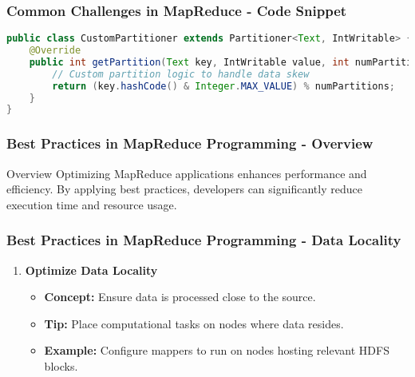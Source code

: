 \documentclass[aspectratio=169]{beamer}
\begin{document}
\begin{frame}[fragile]
    \frametitle{Common Challenges in MapReduce - Code Snippet}
    \begin{lstlisting}[language=Java]
public class CustomPartitioner extends Partitioner<Text, IntWritable> {
    @Override
    public int getPartition(Text key, IntWritable value, int numPartitions) {
        // Custom partition logic to handle data skew
        return (key.hashCode() & Integer.MAX_VALUE) % numPartitions;
    }
}
    \end{lstlisting}
\end{frame}

\begin{frame}[fragile]
    \frametitle{Best Practices in MapReduce Programming - Overview}
    \begin{block}{Overview}
        Optimizing MapReduce applications enhances performance and efficiency. 
        By applying best practices, developers can significantly reduce execution time and resource usage.
    \end{block}
\end{frame}

\begin{frame}[fragile]
    \frametitle{Best Practices in MapReduce Programming - Data Locality}
    \begin{enumerate}
        \item \textbf{Optimize Data Locality}  
            \begin{itemize}
                \item \textbf{Concept:} Ensure data is processed close to the source.
                \item \textbf{Tip:} Place computational tasks on nodes where data resides.
                \item \textbf{Example:} Configure mappers to run on nodes hosting relevant HDFS blocks.
            \end{itemize}
    \end{enumerate}
\end{frame}
\end{document}
